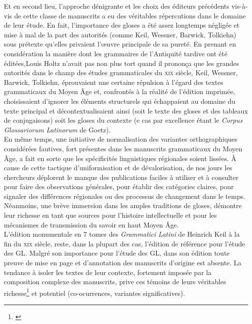 \documentclass[a4paper, twoside, 12pt]{book}
\begin{document}
Et en second lieu, l'approche dénigrante et les choix des éditeurs précédents vis-à-vis de cette classe de manuscrits a eu des véritables répercutions dans le domaine de leur étude. En fait, l’importance des gloses a été assez longtemps négligée et mise à mal de la part des autorités (comme Keil, Wessner, Barwick, Tolkiehn) sous prétexte qu'elles privaient l’œuvre principale de sa pureté. En prenant en considération la manière dont les grammaires de l'Antiquité tardive ont été éditées,Louis Holtz n'avait pas non plus tort quand il prononça que les grandes autorités dans le champ des études grammaticales du \textsc{xix}\ieme{} siècle, Keil, Wessner, Barwick, Tolkiehn, éprouvaient  une certaine répulsion à l'égard des textes grammaticaux du Moyen Âge et, confrontés à la réalité de l'édition imprimée, choisissaient d'ignorer les éléments structurels qui échappaient au domaine du texte principal et décontextualisaient ainsi (soit le texte des gloses et des tableaux de conjugaisons) soit les gloses du contexte (e cas par excellence étant le \textit{Corpus Glossariorum Latinorum} de Goetz).\\

En même temps, une initiative de normalisation des variantes orthographiques considérées fautives, fort présentes dans les manuscrits grammaticaux du Moyen Âge, a fait en sorte que les spécificités linguistiques régionales soient lissées. À cause de cette tactique d'uniformisation et de dévalorisation, de nos jours les chercheurs déplorent le manque des publications faciles à utiliser et à consulter pour faire des observations générales, pour établir des catégories claires, pour signaler des différences régionales ou des processus de changement dans le temps. Néanmoins, une brève immersion dans les amples traditions de gloses, démontre leur richesse en tant que sources pour l'histoire intellectuelle et pour les mécanismes de transmission du savoir en haut Moyen Âge.\\

L’édition monumentale en 7 tomes des \textit{Grammatici Latini} de Heinrich Keil à la fin du \textsc{xix}\ieme{} siècle, reste, dans la plupart des cas, l’édition de référence  pour l’étude des GL. Malgré son importance pour l'étude des GL, dans  son édition toute preuve de mise en page et d’annotation des manuscrits d’origine est absente. La tendance à isoler les textes de leur contexte, fortement imposée par la composition complexe des manuscrits, prive ces témoins de leurs véritables richesse\footnote{\cite{pierazzo2011putting}} et potentiel (co-ocurrences, variantes significatives).\\
\end{document}
